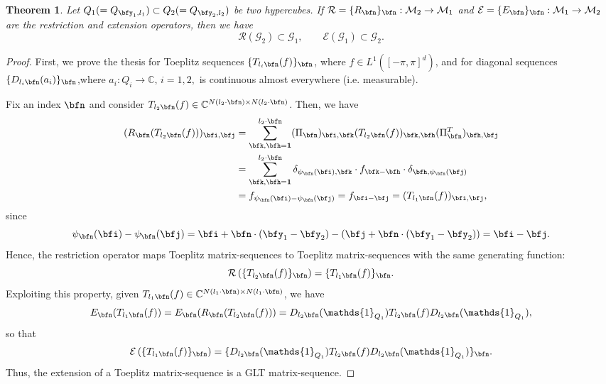 \documentclass{amsart}
\newtheorem{thm}{Theorem}[section]
\begin{document}
\begin{thm}\label{restriction_of_standard_GLT}
	Let $Q_1(=Q_{{\bfy_1},l_1})\subset Q_2(=Q_{{\bfy_2},l_2})$ be two hypercubes.
    If $\mathcal{R}=\{R_{\bfn}\}_\bfn:\mathcal{M}_2\to\mathcal{M}_1$ and $\mathcal{E}=\{E_{\bfn}\}_\bfn:\mathcal{M}_1\to\mathcal{M}_2$ are the restriction and extension operators, then we have
	\begin{equation}\label{GLT_op}
		\mathcal{R}(\mathcal{G}_2)\subset\mathcal{G}_1, \qquad \mathcal{E}(\mathcal{G}_1)\subset\mathcal{G}_2.
	\end{equation}
\end{thm}
\begin{proof}
	First, we prove the thesis for Toeplitz sequences $\{T_{l_i\bfn}(f)\}_\bfn$, where $f\in L^1([-\pi,\pi]^d)$, and for diagonal sequences $\{D_{l_i\bfn}(a_i)\}_\bfn$,where $a_i:Q_i\to\mathbb{C}, \,i=1,2,$ is continuous almost everywhere (i.e. measurable). 
    
    Fix an index $\bfn$ and consider $T_{l_2\bfn}(f)\in\mathbb{C}^{N(l_2\cdot \bfn)\times N(l_2\cdot\bfn)}$. Then, we have 
	\begin{align*}
		(R_{\bfn}(T_{l_2\bfn}(f)))_{\bfi,\bfj}&=\sum_{\bfk,\bfh=\bf1}^{l_2\cdot\bfn}(\Pi_{\bfn})_{\bfi,\bfk}(T_{l_2\bfn}(f))_{\bfk,\bfh}(\Pi_{\bfn}^T)_{\bfh,\bfj}\\
        &=\sum_{\bfk,\bfh=\bf1}^{l_2\cdot\bfn}\delta_{\psi_{\bfn}(\bfi),\bfk}\cdot f_{\bfk-\bfh}\cdot\delta_{\bfh,\psi_{\bfn}(\bfj)}\\
        &=f_{\psi_{\bfn}(\bfi)-\psi_{\bfn}(\bfj)}=f_{\bfi-\bfj}=(T_{l_1\bfn}(f))_{\bfi,\bfj},
	\end{align*}
	since 
	\begin{equation*}
		\psi_{\bfn}(\bfi)-\psi_{\bfn}(\bfj)=\bfi+\bfn\cdot(\bfy_1-\bfy_2)-(\bfj+\bfn\cdot(\bfy_1-\bfy_2))=\bfi-\bfj.
	\end{equation*}
	Hence, the restriction operator maps Toeplitz matrix-sequences to Toeplitz matrix-sequences with the same generating function:
	\begin{equation*}
		\mathcal{R}\left(\{T_{l_2\bfn}(f)\}_{\bfn}\right)=\{T_{l_1\bfn}(f)\}_{\bfn}.
	\end{equation*} 
	Exploiting this property, given $T_{l_1\bfn}(f)\in\mathbb{C}^{N(l_1\cdot \bfn)\times N(l_1\cdot\bfn)}$, we have
	\begin{equation*}
		E_{\bfn}(T_{l_1\bfn}(f))=E_{\bfn}(R_{\bfn}(T_{l_2\bfn}(f)))=D_{l_2\bfn}(\mathds{1}_{Q_1})T_{l_2\bfn}(f)D_{l_2\bfn}(\mathds{1}_{Q_1}),
	\end{equation*}
	so that
	\begin{equation*}
		\mathcal{E}\left(\{T_{l_1\bfn}(f)\}_{\bfn}\right)=\{D_{l_2\bfn}(\mathds{1}_{Q_1})T_{l_2\bfn}(f)D_{l_2\bfn}(\mathds{1}_{Q_1})\}_{\bfn}.
	\end{equation*}
	Thus, the extension of a Toeplitz matrix-sequence is a GLT matrix-sequence.
    

\end{proof}
\end{document}
